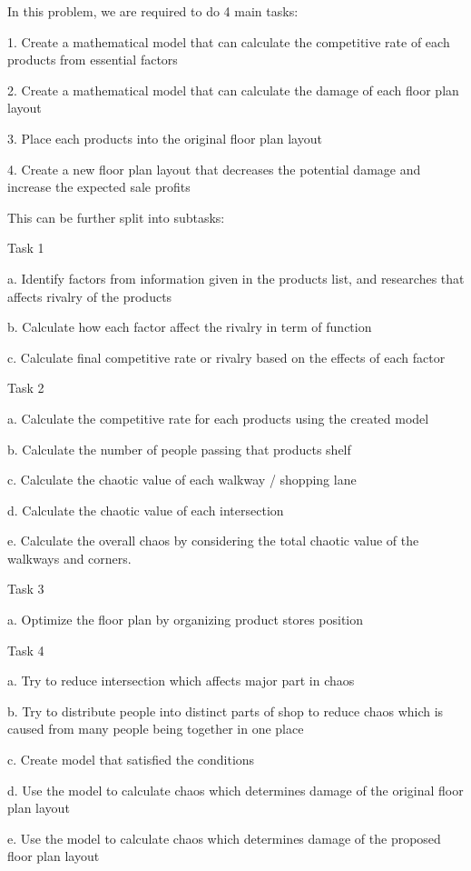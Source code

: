 In this problem, we are required to do 4 main tasks:

1. Create a mathematical model that can calculate the competitive rate of each products from essential factors

2. Create a mathematical model that can calculate the damage of each floor plan layout

3. Place each products into the original floor plan layout

4. Create a new floor plan layout that decreases the potential damage and increase the expected sale profits

\noindent This can be further split into subtasks:

\noindent Task 1

a. Identify factors from information given in the products list, and researches that affects rivalry of the products

b. Calculate how each factor affect the rivalry in term of function

c. Calculate final competitive rate or rivalry based on the effects of each factor

\noindent Task 2

a. Calculate the competitive rate for each products using the created model

b. Calculate the number of people passing that products shelf

c. Calculate the chaotic value of each walkway / shopping lane 

d. Calculate the chaotic value of each intersection 

e. Calculate the overall chaos by considering the total chaotic value of the walkways and corners.

\noindent Task 3

a. Optimize the floor plan by organizing product stores position

\noindent Task 4

a. Try to reduce intersection which affects major part in chaos

b. Try to distribute people into distinct parts of shop to reduce chaos which is caused from many people being together in one place

c. Create model that satisfied the conditions

d. Use the model to calculate chaos which determines damage of the original floor plan layout

e. Use the model to calculate chaos which determines damage of the proposed floor plan layout 
